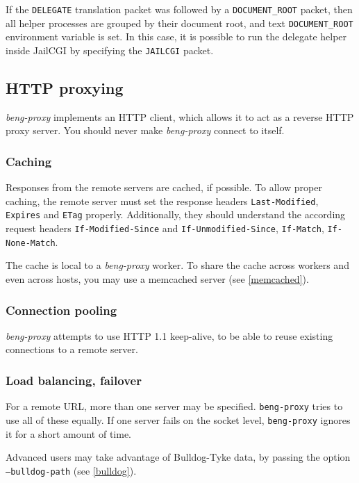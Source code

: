 \documentclass[a4paper,12pt]{article}
\begin{document}
If the \texttt{DELEGATE} translation packet was followed by a
\texttt{DOCUMENT\_ROOT} packet, then all helper processes are grouped
by their document root, and text \texttt{DOCUMENT\_ROOT} environment
variable is set.  In this case, it is possible to run the delegate
helper inside JailCGI by specifying the \texttt{JAILCGI} packet.

\subsection{HTTP proxying}
\label{http}

\emph{beng-proxy} implements an HTTP client, which allows it to act as
a reverse HTTP proxy server.  You should never make \emph{beng-proxy}
connect to itself.

\subsubsection{Caching}
\label{caching}

Responses from the remote servers are cached, if possible.  To allow
proper caching, the remote server must set the response headers
\texttt{Last-Modified}, \texttt{Expires} and \texttt{ETag} properly.
Additionally, they should understand the according request headers
\texttt{If-Modified-Since} and \texttt{If-Unmodified-Since},
\texttt{If-Match}, \texttt{If-None-Match}.

The cache is local to a \emph{beng-proxy} worker.  To share the cache
across workers and even across hosts, you may use a memcached server
(see \ref{memcached}).

\subsubsection{Connection pooling}

\emph{beng-proxy} attempts to use HTTP 1.1 keep-alive, to be able to
reuse existing connections to a remote server.

\subsubsection{Load balancing, failover}
\label{balancing}

For a remote URL, more than one server may be specified.
\texttt{beng-proxy} tries to use all of these equally.  If one server
fails on the socket level, \texttt{beng-proxy} ignores it for a short
amount of time.

Advanced users may take advantage of Bulldog-Tyke data, by passing
the option \texttt{--bulldog-path} (see \ref{bulldog}).
\end{document}
